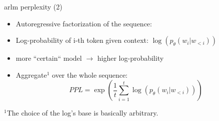 
\begin{frame}{arlm perplexity (2)}

\vfill
\begin{itemize}
	\item Autoregressive factorization of the sequence:
\end{itemize}

\begin{figure}
    \centering
\end{figure}

\begin{itemize}
	\item Log-probability of i-th token given context: $\log(p_\theta(w_i|w_{<i}))$
	\item[] more ``certain`` model $\to$ higher log-probability
	\item Aggregate$^1$ over the whole sequence:
				$$PPL = \exp\left(\frac{1}{t} \sum_{i=1}^t \log(p_\theta(w_i|w_{<i}))\right)$$
\end{itemize}

\vfill

\footnotesize{$^1$The choice of the log’s base is basically arbitrary.}

\end{frame}


